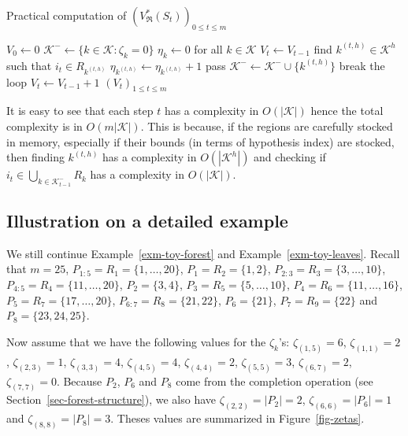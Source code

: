 \documentclass[
  11pt,
  a4paper,
]{article}
\theoremstyle{plain}
\theoremstyle{plain}
\theoremstyle{plain}
\theoremstyle{definition}
\theoremstyle{definition}
\theoremstyle{remark}
\begin{document}
\begin{algorithm}[htb!]
\caption{Practical computation of $(V^*_{\mathfrak{R}}(S_t))_{0\leq t\leq m}$}
\label{alg-curve}
\begin{algorithmic}[1]
  \State $V_0\gets 0$
  \State $\mathcal{K}^-\gets\{k\in\mathcal{K} : \zeta_k=0  \}$
  \State $\eta_k\gets 0$ for all $k\in\mathcal{K}$
      \State $V_{t}\gets V_{t-1}$
    \Else
        \State find $k^{(t,h)}\in\mathcal{K}^{h}$ such that $i_t\in R_{k^{(t,h)}}$
        \State $\eta_{k^{(t,h)}}\gets\eta_{k^{(t,h)}} + 1$
          \State pass
        \Else
          \State $\mathcal{K}^- \gets \mathcal{K}^-\cup \{ k^{(t,h)} \}$
          \State break the loop
        \EndIf
      \EndFor
     \State $V_{t}\gets V_{t-1} + 1$
    \EndIf
  \EndFor
  \State\Return $(V_t)_{1\leq t \leq m}$
\EndProcedure
\end{algorithmic}
\end{algorithm}

It is easy to see that each step \(t\) has a complexity in
\(O(|\mathcal{K}|)\) hence the total complexity is in
\(O(m|\mathcal{K}|)\). This is because, if the regions are carefully
stocked in memory, especially if their bounds (in terms of hypothesis
index) are stocked, then finding \(k^{(t,h)}\) has a complexity in
\(O(|\mathcal{K}^h|)\) and checking if
\(i_t\in\bigcup_{k\in\mathcal{K}^-_{t-1}}R_k\) has a complexity in
\(O(|\mathcal{K}|)\).

\subsection{Illustration on a detailed example}\label{sec-example}

We still continue Example~\ref{exm-toy-forest} and
Example~\ref{exm-toy-leaves}. Recall that \(m=25\),
\(P_{1:5}=R_1 = \{1, \dotsc , 20 \}\), \(P_1=R_2  =  \{1, 2  \}\),
\(P_{2:3}=R_3   =   \{3 , \dotsc , 10 \}\),
\(P_{4:5}=R_4  =    \{11, \dotsc , 20 \}\), \(P_2=\{3,4\}\),
\(P_3=R_5 =  \{5, \dotsc , 10 \}\),
\(P_4=R_6   =     \{11, \dotsc , 16 \}\),
\(P_5=R_7  =   \{17, \dotsc ,20  \}\), \(P_{6:7}=R_8=\{21,22\}\),
\(P_6=\{21\}\), \(P_7=R_9 = \{22\}\) and \(P_8=\{23,24,25\}\).

Now assume that we have the following values for the \(\zeta_k\)'s:
\(\zeta_{(1,5)}=6\), \(\zeta_{(1, 1)}=2\), \(\zeta_{(2, 3)}=1\),
\(\zeta_{(3, 3)}=4\), \(\zeta_{(4, 5)}=4\), \(\zeta_{(4, 4)}=2\),
\(\zeta_{(5, 5)}=3\), \(\zeta_{(6, 7)}=2\), \(\zeta_{(7, 7)}=0\).
Because \(P_2\), \(P_6\) and \(P_8\) come from the completion operation
(see Section~\ref{sec-forest-structure}), we also have
\(\zeta_{(2, 2)}=|P_2|=2\), \(\zeta_{(6, 6)}=|P_6|=1\) and
\(\zeta_{(8, 8)}=|P_8|=3\). Theses values are summarized in
Figure~\ref{fig-zetas}.
\end{document}
